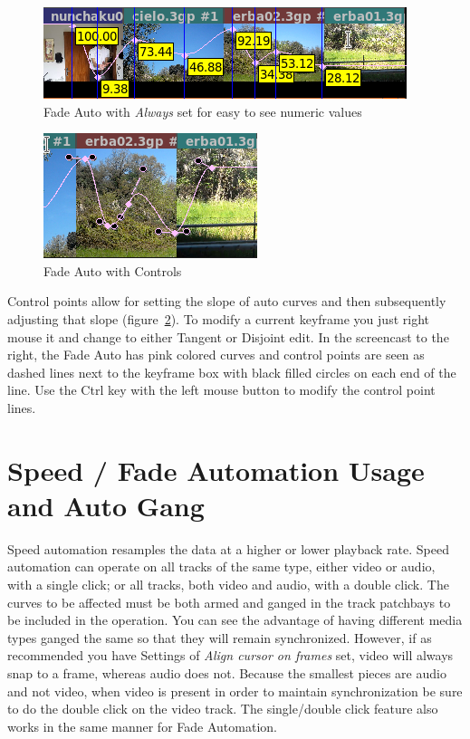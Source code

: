 \begin{figure}[htpb]
    \centering
    \includegraphics[width=0.8\linewidth]{images/always.png}
    \caption{Fade Auto with \textit{Always} set for easy to see numeric values}
    \label{fig:always}
\end{figure}

\begin{figure}
    \vspace{-2ex}
    \centering
    \includegraphics[width=0.79\linewidth]{images/controls.png}
    \caption{Fade Auto with Controls}
    \label{fig:controls}
\end{figure}

Control points allow for setting the slope of auto curves and then
subsequently adjusting that slope (figure~\ref{fig:controls}).  To modify a current keyframe
you just right mouse it and change to either Tangent or Disjoint edit.
In the screencast to the right, the Fade Auto has pink colored curves and control points are seen as dashed lines next to the keyframe box with black filled circles on each end of the line.  Use the Ctrl key with the left mouse button to modify the control point lines.

\section{Speed / Fade Automation Usage and Auto Gang}%
\label{sec:speed_fade_automation_gang}

Speed automation resamples the data at a higher or lower playback rate. Speed automation can operate
on all tracks of the same type, either video or audio, with a single click; or all tracks, both video and
audio, with a double click. The curves to be affected must be both armed and ganged in the track
patchbays to be included in the operation. You can see the advantage of having different media types
ganged the same so that they will remain synchronized.  However, if as recommended you have Settings of \textit{Align cursor on frames} set, video will always snap to a frame, whereas audio does not.  Because the smallest pieces are audio and not video, when video is present in order to maintain synchronization be sure to do the double click on the video track.  The single/double click feature also works in the same manner for Fade Automation.

